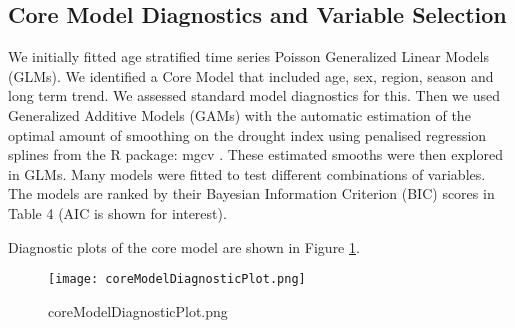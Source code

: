 \documentclass[a4paper]{article}                %
\begin{document}
\subsection{Core Model Diagnostics and Variable Selection}



        We initially fitted age stratified time series Poisson Generalized Linear Models (GLMs). We identified a Core Model that included age, sex, region, season and long term trend.  We assessed standard model diagnostics for this.
        Then we used Generalized Additive Models (GAMs) with the automatic estimation of the optimal amount of smoothing on the drought index using penalised regression splines from the R package: mgcv \cite{Wood2008}.  These estimated smooths were then explored in GLMs. Many models were fitted to test different combinations of variables.  The models are ranked by their Bayesian Information Criterion (BIC) scores in Table 4 (AIC is shown for interest).







        Diagnostic plots of the core model are shown in Figure \ref{fig:coreModelDiagnosticPlot.png}.

        \begin{figure}[!h]
        \centering
        \texttt{[image: coreModelDiagnosticPlot.png]}
        \caption{coreModelDiagnosticPlot.png}
        \label{fig:coreModelDiagnosticPlot.png}
        \end{figure}





\end{document}
